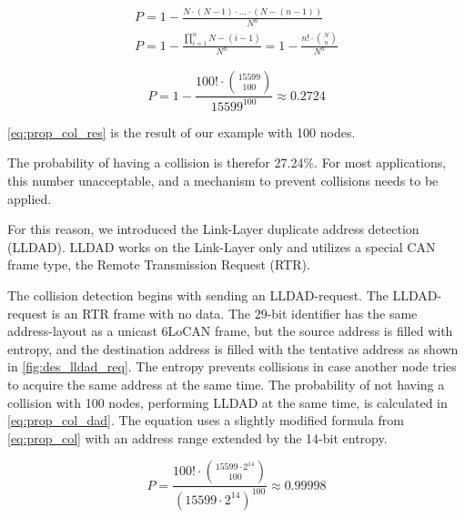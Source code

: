 \begin{equation}
	\begin{split}
		P = 1 - \frac{N \cdot (N-1) \cdot ... \cdot (N - (n - 1))}{N^n} \\
		P = 1 - \frac{\displaystyle\prod_{i=1}^{n} N - (i - 1)}{N^n} = 1 -\frac{n! \cdot \binom{N}{n}} {N^n}
	\end{split}
	\label{eq:prop_col}
	\end{equation}
	
	\begin{equation}
		P = 1 - \frac{100! \cdot \binom{15599}{100}}{15599^{100}} \approx 0.2724
	\label{eq:prop_col_res}
	\end{equation}

\autoref{eq:prop_col_res} is the result of our example with 100 nodes.

The probability of having a collision is therefor 27.24\%.
For most applications, this number unacceptable, and a mechanism to prevent collisions needs to be applied.

For this reason, we introduced the Link-Layer duplicate address detection (LLDAD).
LLDAD works on the Link-Layer only and utilizes a special CAN frame type, the Remote Transmission Request (RTR).



The collision detection begins with sending an LLDAD-request.
The LLDAD-request is an RTR frame with no data.
The 29-bit identifier has the same address-layout as a unicast 6LoCAN frame, but the source address is filled with entropy,
and the destination address is filled with the tentative address as shown in  \autoref{fig:des_lldad_req}.
The entropy prevents collisions in case another node tries to acquire the same address at the same time.
The probability of not having a collision with 100 nodes, performing LLDAD at the same time, is calculated in \autoref{eq:prop_col_dad}.
The equation uses a slightly modified formula from \autoref{eq:prop_col} with an address range extended by the 14-bit entropy.

\begin{equation}
	P = \frac{100! \cdot \binom{15599 \cdot 2^{14}}{100}}{(15599 \cdot 2^{14})^{100}} \approx 0.99998
\label{eq:prop_col_dad}
\end{equation}



